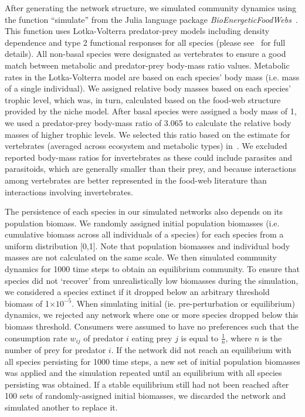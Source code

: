 \documentclass[12pt]{article}
\begin{document}
\begin{spacing}{2.0}
  
    		After generating the network structure, we simulated community dynamics using the function ``simulate'' from the Julia language package \emph{BioEnergeticFoodWebs}~\citep{bioenergeticfw,Delmas2017}. This function uses Lotka-Volterra predator-prey models including density dependence and type 2 functional responses for all species (please see~\citet{Delmas2017} for full details).
    		All non-basal species were designated as vertebrates to ensure a good match between metabolic and predator-prey body-mass ratio values. Metabolic rates in the Lotka-Volterra model are based on each species' body mass (i.e. mass of a single individual). We assigned relative body masses based on each species' trophic level, which was, in turn, calculated based on the food-web structure provided by the niche model. After basal species were assigned a body mass of 1, we used a predator-prey body-mass ratio of 3.065 to calculate the relative body masses of higher trophic levels. We selected this ratio based on the estimate for vertebrates (averaged across ecosystem and metabolic types) in~\citet{Brose2006}. We excluded reported body-mass ratios for invertebrates as these could include parasites and parasitoids, which are generally smaller than their prey, and because interactions among vertebrates are better represented in the food-web literature than interactions involving invertebrates.
    		
    		
    		The persistence of each species in our simulated networks also depends on its population biomass. 
    		We randomly assigned initial population biomasses (i.e. cumulative biomass across all individuals of a species) for each species from a uniform distribution [0,1]. Note that population biomasses and individual body masses are not calculated on the same scale. We then simulated community dynamics for 1000 time steps to obtain an equilibrium community. To ensure that species did not `recover' from unrealistically low biomasses during the simulation, we considered a species extinct if it dropped below an arbitrary threshold biomass of 1$\times10^{-5}$. When simulating initial (ie. pre-perturbation or equilibrium) dynamics, we rejected any network where one or more species dropped below this biomass threshold. Consumers were assumed to have no preferences such that the consumption rate $w_{ij}$ of predator $i$ eating prey $j$ is equal to $\frac{1}{n}$, where $n$ is the number of prey for predator $i$. If the network did not reach an equilibrium with all species persisting for 1000 time steps, a new set of initial population biomasses was applied and the simulation repeated until an equilibrium with all species persisting was obtained.
    		If a stable equilibrium still had not been reached after 100 sets of randomly-assigned initial biomasses, we discarded the network and simulated another to replace it.
    

\end{spacing}
\end{document}
